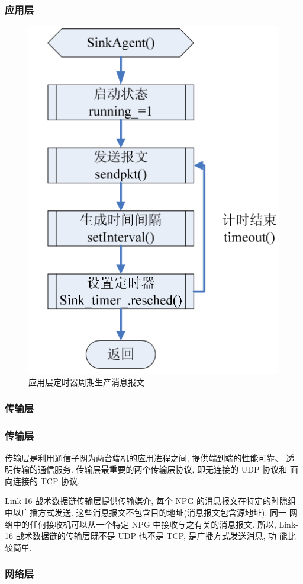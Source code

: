 \documentclass[10pt,mathserif]{beamer}%
\begin{document}
\begin{frame}[fragile]
	\frametitle{应用层}
	\setlength{\parindent}{2em}
	\begin{spacing}{1.5}
		\begin{figure}[htb]
			\centering
			\includegraphics[width=0.5\linewidth]{./images/app.png}
			\caption{应用层定时器周期生产消息报文}
			\label{Fig:app}
		\end{figure}
	\end{spacing}
\end{frame}

\subsubsection{传输层}

\begin{frame}[fragile]
	\frametitle{传输层}
	\setlength{\parindent}{2em}
	\begin{spacing}{1.5}
		传输层是利用通信子网为两台端机的应用进程之间, 提供端到端的性能可靠、 透
		明传输的通信服务. 传输层最重要的两个传输层协议, 即无连接的 UDP 协议和 面
		向连接的 TCP 协议. 

		Link-16 战术数据链传输层提供传输媒介, 每个 NPG 的消息报文在特定的时隙组
		中以广播方式发送. 这些消息报文不包含目的地址(消息报文包含源地址).  同一
		网络中的任何接收机可以从一个特定 NPG 中接收与之有关的消息报文. 所以,
		Link-16 战术数据链的传输层既不是 UDP 也不是 TCP, 是广播方式发送消息, 功
		能比较简单. 
	\end{spacing}
\end{frame}

\subsubsection{网络层}
\end{document}
